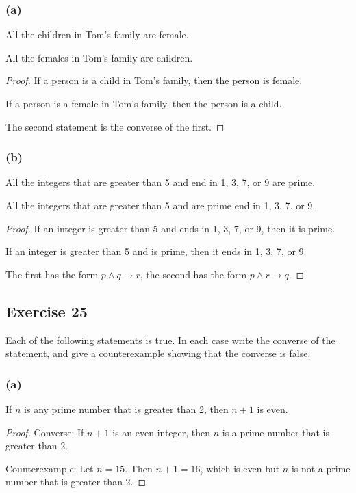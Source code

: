 \documentclass[14pt]{extarticle}
\begin{document}
\subsubsection{(a)}
All the children in Tom’s family are female. 

All the females in Tom’s family are children.

\begin{proof}
If a person is a child in Tom’s family, then the person is female.

If a person is a female in Tom’s family, then the person is a child.

The second statement is the converse of the first.
\end{proof}

\subsubsection{(b)}
All the integers that are greater than 5 and end in 1, 3, 7, or 9 are prime. 

All the integers that are greater than 5 and are prime end in 1, 3, 7, or 9.

\begin{proof}
If an integer is greater than 5 and ends in 1, 3, 7, or 9, then it is prime. 

If an integer is greater than 5 and is prime, then it ends in 1, 3, 7, or 9.

The first has the form $p \wedge q \to r$, the second has the form $p \wedge r \to q$.
\end{proof}

\subsection{Exercise 25}
Each of the following statements is true. In each case write the converse of the statement, and give a counterexample showing that the converse is false.

\subsubsection{(a)}
If $n$ is any prime number that is greater than 2, then $n + 1$ is even.

\begin{proof}
Converse: If $n + 1$ is an even integer, then $n$ is a prime number that is greater than 2.

Counterexample: Let $n = 15$. Then $n + 1 = 16$, which is even but $n$ is not a prime number that is greater than 2.
\end{proof}
\end{document}
